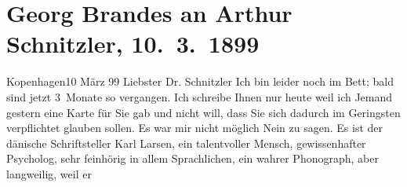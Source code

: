 

         
         \newcommand{\erwaehntePersonen}{Personen: Theodor Barth, Paul Goldmann, Karl Larsen, Peter Nansen, Annie Vivanti}
         \newcommand{\erwaehnteInstitutionen}{Institutionen: Die Nation, Frankfurter Zeitung, Neue Freie Presse}
         \newcommand{\erwaehnteOrte}{Orte: Deutschland, Dänemark, Europa, Italien, Kopenhagen, Südschleswig, Wien}
         \newcommand{\erwaehnteWerke}{Werke: Annie Vivanti, Das Dänentum in Südjütland, Das Vermächtnis. Schauspiel in drei Akten, Der grüne Kakadu. Groteske in einem Akt, Die Zukunft, Samlede Skrifter [Gesammelte Werke], Tilskueren, Ungdomsvers [Jugendgedichte], [Gedichte]}
               \section[Georg Brandes an Arthur Schnitzler, 10. 3. 1899]{ Georg Brandes an Arthur Schnitzler, 10. 3. 1899}\nopagebreak{}\rehead{ }\begin{ledgroupsized}[t]{13cm}\normalsize\beginnumbering \toendnotes[C]{\smallbreak\pagebreak[2]} 
\toendnotes[C]{\smallbreak}\pstart
           \raggedleft{}{\pb}Kopenhagen10 März 99\pend
           \pstart{}Liebster Dr. Schnitzler\pend\pstart
           Ich bin leider noch im Bett; bald sind jetzt 3 Monate so vergangen. Ich schreibe
               Ihnen nur heute weil ich Jemand
               gestern eine Karte für Sie gab und nicht will, dass Sie sich dadurch im Geringsten
               verpflichtet glauben sollen. Es war mir nicht möglich Nein zu sagen. Es ist der dänische Schriftsteller Karl Larsen, ein talentvoller Mensch, gewissenhafter Psycholog,
               sehr feinhörig in allem Sprachlichen, ein wahrer Phonograph, aber langweilig, weil er

\end{ledgroupsized}
